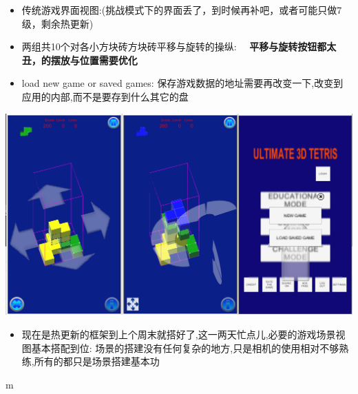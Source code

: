 \documentclass[9pt, b5paper]{article}
\begin{document}
\begin{itemize}
\item 传统游戏界面视图:(挑战模式下的界面丢了，到时候再补吧，或者可能只做7级，剩余热更新)
\item 两组共10个对各小方块砖方块砖平移与旋转的操纵:　 \textbf{平移与旋转按钮都太丑，的摆放与位置需要优化}
\item load new game or saved games: 保存游戏数据的地址需要再改变一下,改变到应用的内部,而不是要存到什么其它的盘
\end{itemize}

\includegraphics[width=.9\linewidth]{./pic/readme_20221007_195217.png}
\begin{itemize}
\item 现在是热更新的框架到上个周末就搭好了,这一两天忙点儿,必要的游戏场景视图基本搭配到位: 场景的搭建没有任何复杂的地方,只是相机的使用相对不够熟练,所有的都只是场景搭建基本功
\end{itemize}
m
\end{document}
